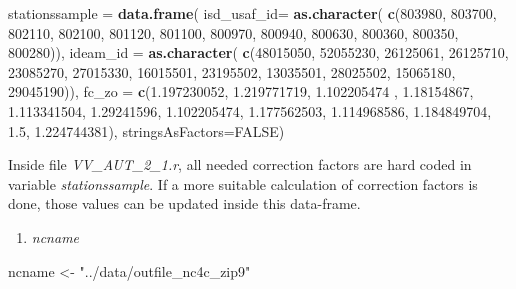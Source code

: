 \documentclass[12pt,twoside]{reedthesis}
\newenvironment{Shaded}{\begin{snugshade}}{\end{snugshade}}
\newcommand{\DataTypeTok}[1]{\textcolor[rgb]{0.13,0.29,0.53}{#1}}
\newcommand{\DecValTok}[1]{\textcolor[rgb]{0.00,0.00,0.81}{#1}}
\newcommand{\FloatTok}[1]{\textcolor[rgb]{0.00,0.00,0.81}{#1}}
\newcommand{\KeywordTok}[1]{\textcolor[rgb]{0.13,0.29,0.53}{\textbf{#1}}}
\newcommand{\NormalTok}[1]{#1}
\newcommand{\OtherTok}[1]{\textcolor[rgb]{0.56,0.35,0.01}{#1}}
\newcommand{\StringTok}[1]{\textcolor[rgb]{0.31,0.60,0.02}{#1}}
\providecommand{\tightlist}{%
  \setlength{\itemsep}{0pt}\setlength{\parskip}{0pt}}
\begin{document}
\vspace{0.4cm}
\begin{Shaded}
\begin{Highlighting}[]
\NormalTok{    stationssample =}\StringTok{ }\KeywordTok{data.frame}\NormalTok{(}
      \DataTypeTok{isd_usaf_id=} \KeywordTok{as.character}\NormalTok{(}
        \KeywordTok{c}\NormalTok{(}\DecValTok{803980}\NormalTok{, }\DecValTok{803700}\NormalTok{, }\DecValTok{802110}\NormalTok{, }\DecValTok{802100}\NormalTok{, }\DecValTok{801120}\NormalTok{, }\DecValTok{801100}\NormalTok{, }
          \DecValTok{800970}\NormalTok{, }\DecValTok{800940}\NormalTok{, }\DecValTok{800630}\NormalTok{, }\DecValTok{800360}\NormalTok{, }\DecValTok{800350}\NormalTok{, }\DecValTok{800280}\NormalTok{)), }
      \DataTypeTok{ideam_id =} \KeywordTok{as.character}\NormalTok{(}
        \KeywordTok{c}\NormalTok{(}\DecValTok{48015050}\NormalTok{, }\DecValTok{52055230}\NormalTok{, }\DecValTok{26125061}\NormalTok{, }\DecValTok{26125710}\NormalTok{, }\DecValTok{23085270}\NormalTok{, }\DecValTok{27015330}\NormalTok{, }
          \DecValTok{16015501}\NormalTok{, }\DecValTok{23195502}\NormalTok{, }\DecValTok{13035501}\NormalTok{, }\DecValTok{28025502}\NormalTok{, }\DecValTok{15065180}\NormalTok{, }\DecValTok{29045190}\NormalTok{)),}
      \DataTypeTok{fc_zo =} 
        \KeywordTok{c}\NormalTok{(}\FloatTok{1.197230052}\NormalTok{, }\FloatTok{1.219771719}\NormalTok{, }\FloatTok{1.102205474}\NormalTok{ , }\FloatTok{1.18154867}\NormalTok{, }\FloatTok{1.113341504}\NormalTok{, }\FloatTok{1.29241596}\NormalTok{, }
          \FloatTok{1.102205474}\NormalTok{, }\FloatTok{1.177562503}\NormalTok{, }\FloatTok{1.114968586}\NormalTok{, }\FloatTok{1.184849704}\NormalTok{, }\FloatTok{1.5}\NormalTok{, }\FloatTok{1.224744381}\NormalTok{),  }
      \DataTypeTok{stringsAsFactors=}\OtherTok{FALSE}\NormalTok{)}
\end{Highlighting}
\end{Shaded}
\normalsize

Inside file \emph{VV\_AUT\_2\_1.r}, all needed correction factors are hard coded in variable \emph{stationssample}. If a more suitable calculation of correction factors is done, those values can be updated inside this data-frame.
\begin{enumerate}
\def\labelenumi{\arabic{enumi}.}
\setcounter{enumi}{2}
\tightlist
\item
  \emph{ncname}
\end{enumerate}
\scriptsize

\vspace{0.4cm}
\begin{Shaded}
\begin{Highlighting}[]
\NormalTok{      ncname <-}\StringTok{ "../data/outfile_nc4c_zip9"}
\end{Highlighting}
\end{Shaded}
\normalsize
\end{document}
